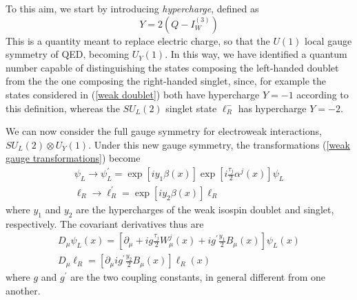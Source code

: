 \documentclass[10pt,a4paper]{book}
\begin{document}
To this aim, we start by introducing \emph{hypercharge}, defined as
\begin{equation}
\label{def hypercharge}
Y = 2(Q-I^{(3)}_W)
\end{equation} 
This is a quantity meant to replace electric charge, so that the $U(1)$ local gauge symmetry of QED, becoming $U_Y(1)$. In this way, we have identified a quantum number capable of distinguishing the states composing the left-handed doublet from the the one composing the right-handed singlet, since, for example the states considered in (\ref{weak doublet}) both have hypercharge $Y=-1$ according to this definition, whereas the $SU_L(2)$ singlet state $\ell^-_R$ has hypercharge $Y=-2$. 

We can now consider the full gauge symmetry for electroweak interactions, $SU_L(2) \otimes U_Y(1)$. Under this new gauge symmetry, the transformations (\ref{weak gauge transformations}) become
\begin{gather}
\label{electroweak gauge transformations}
\psi_L \rightarrow \psi_L^\prime = \exp\left[iy_1\beta(x)\right]\exp\left[i\frac{\tau_j}{2} \alpha^j (x)\right]\psi_L \\
\ell_R \rightarrow \ell_R^\prime = \exp\left[iy_2\beta(x)\right]\ell_R
\end{gather}
where $y_1$ and $y_2$ are the hypercharges of the weak isospin doublet and singlet, respectively. The covariant derivatives thus are
\begin{gather}
\label{EW covariant}
D_\mu \psi_L(x) = \left[\partial_\mu + ig\frac{\tau_j}{2}W^j_\mu(x) + ig^\prime \frac{y_1}{2} B_\mu(x) \right]\psi_L(x) \\
D_\mu \ell_R = \left[\partial_\mu ig^\prime \frac{y_2}{2} B_\mu(x)\right]\ell_R(x)
\end{gather}
where $g$ and $g^\prime$ are the two coupling constants, in general different from one another.
\end{document}
